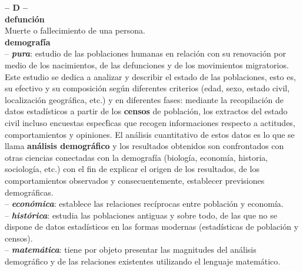 \begin{multicols}{2}
\noindent\textbf{\huge{-- D --}}\\

\noindent \textbf{\Large{defunción}}\\

\vspace{-0.3cm}
Muerte o fallecimiento de una persona.\\

\noindent \textbf{\Large{demograf\'ia}}\\

\vspace{-0.3cm}
-- \textbf{\textit{pura}}: estudio de las poblaciones humanas en relaci\'on con su renovaci\'on por medio de los nacimientos, de las defunciones y de los movimientos migratorios. Este estudio se dedica a analizar y describir el estado de las poblaciones, esto es, su efectivo y su composici\'on seg\'un diferentes criterios (edad, sexo, estado civil, localizaci\'on geogr\'afica, etc.) y en diferentes fases: mediante la recopilaci\'on de datos estad\'isticos a partir de los \textbf{censos} de poblaci\'on, los extractos del estado civil incluso encuestas espec\'ficas que recogen informaciones respecto a actitudes, comportamientos y opiniones. El an\'alisis cuantitativo de estos datos es lo que se llama \textbf{an\'alisis demogr\'afico} y los resultados obtenidos son confrontados con otras ciencias conectadas con la demograf\'ia (biolog\'ia, econom\'ia, historia, sociolog\'ia, etc.) con el fin de explicar el origen de los resultados, de los comportamientos observados y consecuentemente, establecer previsiones demogr\'aficas.\\

\vspace{-0.3cm}
-- \textbf{\textit{econ\'omica}}: establece las relaciones rec\'iprocas entre poblaci\'on y econom\'ia.\\

\vspace{-0.3cm}
-- \textbf{\textit{hist\'orica}}: estudia las poblaciones antiguas y sobre todo, de las que no se dispone de datos estad\'isticos en las formas modernas (estad\'isticas de poblaci\'on y censos).\\

\vspace{-0.3cm}
-- \textbf{\textit{matem\'atica}}: tiene por objeto presentar las magnitudes del an\'alisis demogr\'afico y de las relaciones existentes utilizando el lenguaje matem\'atico.\\


\end{multicols}
